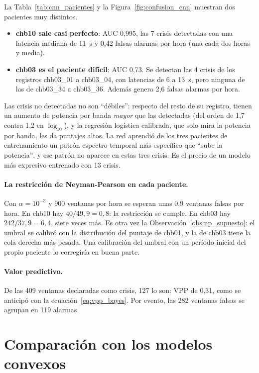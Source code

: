 La Tabla~\ref{tab:cnn_pacientes} y la Figura~\ref{fig:confusion_cnn} muestran dos pacientes muy distintos.
\begin{itemize}
  \item \textbf{chb10 sale casi perfecto}: AUC 0,995, las 7 crisis detectadas con una latencia mediana de 11~s y 0,42 falsas
        alarmas por hora (una cada dos horas y media).
  \item \textbf{chb03 es el paciente difícil}: AUC 0,73. Se detectan las 4 crisis de los registros chb03\_01 a chb03\_04, con
        latencias de 6 a 13~s, pero ninguna de las de chb03\_34 a chb03\_36. Además genera 2,6 falsas alarmas por hora.
\end{itemize}

Las crisis no detectadas no son ``débiles'': respecto del resto de su registro, tienen un aumento de potencia por banda
\emph{mayor} que las detectadas (del orden de 1,7 contra 1,2 en $\log_{10}$), y la regresión logística calibrada, que solo
mira la potencia por banda, les da puntajes altos. La red aprendió de los tres pacientes de entrenamiento un patrón
espectro-temporal más específico que ``sube la potencia'', y ese patrón no aparece en estas tres crisis. Es el precio de un
modelo más expresivo entrenado con 13 crisis.

\paragraph{La restricción de Neyman-Pearson en cada paciente.} Con $\alpha = 10^{-3}$ y 900 ventanas por hora se esperan
unas 0,9 ventanas falsas por hora. En chb10 hay $40/49{,}9 = 0{,}8$: la restricción se cumple. En chb03 hay
$242/37{,}9 = 6{,}4$, siete veces más. Es otra vez la Observación~\ref{obs:np_supuesto}: el umbral se calibró con la
distribución del puntaje de chb01, y la de chb03 tiene la cola derecha más pesada. Una calibración del umbral con un
período inicial del propio paciente lo corregiría en buena parte.

\paragraph{Valor predictivo.} De las 409 ventanas declaradas como crisis, 127 lo son: VPP de 0,31, como se anticipó con la
ecuación~\eqref{eq:vpp_bayes}. Por evento, las 282 ventanas falsas se agrupan en 119 alarmas.

\section{Comparación con los modelos convexos}
\label{sec:res_comparacion}


